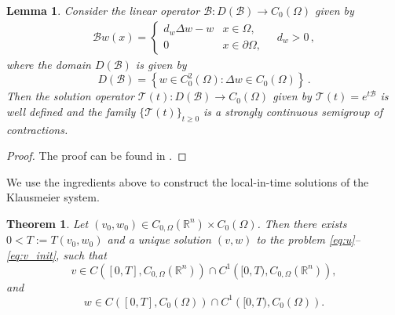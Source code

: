 \documentclass[preprint,12pt]{elsarticle}
\theoremstyle{plain}
\newtheorem{thm}{Theorem}[section]
\newtheorem{lem}{Lemma}[section]
\theoremstyle{definition}
\theoremstyle{remark}
\begin{document}
\begin{lem}
    \label{lem:B_SEMIGROUP_GENERATOR}
    Consider the linear operator $\mathcal{B}: D(\mathcal{B}) \to C_0(\Omega)$ given by 
    \begin{align}
        \label{EQ:B_OPERATOR_DEFINITION}
        \mathcal{B} w (x) = 
        \begin{cases}
            d_w \Delta w - w &x \in \Omega, \\
            0 &x \in \partial \Omega, 
        \end{cases} \quad d_w > 0 \,, 
    \end{align}
    where the domain $D(\mathcal{B})$ is given by
    \begin{equation}
        \label{EQ:B_DOMAIN_DEFINITION}
        D(\mathcal{B}) = \left\{ w \in C^2_0(\Omega): \Delta w \in C_0(\Omega) \right\}\,.
    \end{equation}
    Then the solution operator $\mathcal{T}(t): D(\mathcal{B}) \to C_0(\Omega)$ given by $\mathcal{T}(t) = e^{t\mathcal{B}}$ is well defined and the family $\{\mathcal{T}(t)\}_{t \geq 0}$ is a strongly continuous semigroup of contractions.
\end{lem}
\begin{proof}
    The proof can be found in  \cite[Theorem 6.1.8]{Arendt2001}.
\end{proof}
We use the ingredients above to construct the local-in-time solutions of the Klausmeier system.
\begin{thm}
    \label{thm:Well-Posedness}
    Let $(v_0, w_0) \in C_{0, \Omega}(\mathbb{R}^n) \times C_0(\Omega)$. Then there exists $0 < T := T(v_0, w_0)$ and a unique solution $(v, w)$ to the problem \eqref{eq:u}--\eqref{eq:v_init}, such that
    \begin{equation}
        v \in C\left([0, T], C_{0, \Omega}(\mathbb{R}^n)\right) \cap C^1\left([0, T), C_{0, \Omega}(\mathbb{R}^n)\right),
    \end{equation}
    and
    \begin{equation}
        w \in C\left([0, T], C_0(\Omega)\right) \cap C^1\left([0, T), C_0(\Omega)\right).
    \end{equation}
\end{thm}
\end{document}
